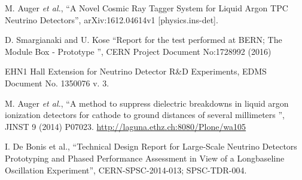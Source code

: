 \begin{thebibliography}{99}
M. Auger {\it et al.}, ``A Novel Cosmic Ray Tagger System for Liquid Argon TPC Neutrino Detectors'', arXiv:1612.04614v1 [physics.ins-det].

D. Smargianaki and U. Kose ``Report for the test performed at BERN; The Module Box - Prototype '', CERN Project Document No:1728992 (2016)

 EHN1 Hall Extension for Neutrino Detector R\&D Experiments, EDMS Document No. 1350076 v. 3.

M. Auger {\it et al.}, ``A method to suppress dielectric breakdowns in liquid argon ionization detectors for cathode to ground distances of several millimeters '', JINST 9 (2014) P07023.%
\url{http://laguna.ethz.ch:8080/Plone/wa105}

I. De Bonis {et al.}, ``Technical Design Report for Large-Scale Neutrino Detectors Prototyping and Phased Performance Assessment in View of a Longbaseline Oscillation Experiment'', CERN-SPSC-2014-013; SPSC-TDR-004.


\end{thebibliography}
\textbf{}